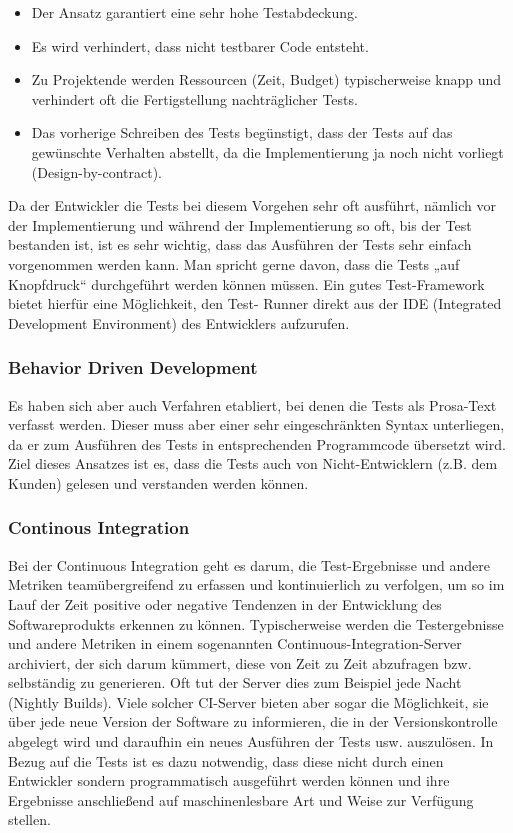 \begin{itemize}
  \item Der Ansatz garantiert eine sehr hohe Testabdeckung.
  \item Es wird verhindert, dass nicht testbarer Code entsteht.
  \item Zu Projektende werden Ressourcen (Zeit, Budget) typischerweise knapp und verhindert oft die Fertigstellung nachträglicher Tests.
  \item Das vorherige Schreiben des Tests begünstigt, dass der Tests auf das gewünschte Verhalten abstellt, da die Implementierung ja noch nicht vorliegt (Design-by-contract).
\end{itemize}

Da der Entwickler die Tests bei diesem Vorgehen sehr oft ausführt, nämlich vor der Implementierung und während der Implementierung so oft, bis der Test bestanden ist, ist es sehr wichtig, dass das Ausführen der Tests sehr einfach vorgenommen werden kann. Man spricht gerne davon, dass die Tests „auf Knopfdruck“ durchgeführt werden können müssen. Ein gutes Test-Framework bietet hierfür eine Möglichkeit, den Test- Runner direkt aus der IDE (Integrated Development Environment) des Entwicklers aufzurufen.

\subsubsection{Behavior Driven Development}
Es haben sich aber auch Verfahren etabliert, bei denen die Tests als Prosa-Text verfasst werden. Dieser muss aber einer sehr eingeschränkten Syntax unterliegen, da er zum Ausführen des Tests in entsprechenden Programmcode übersetzt wird. Ziel dieses Ansatzes ist es, dass die Tests auch von Nicht-Entwicklern (z.B. dem Kunden) gelesen und verstanden werden können.

\subsubsection{Continous Integration}
Bei der Continuous Integration geht es darum, die Test-Ergebnisse und andere Metriken teamübergreifend zu erfassen und kontinuierlich zu verfolgen, um so im Lauf der Zeit positive oder negative Tendenzen in der Entwicklung des Softwareprodukts erkennen zu können. Typischerweise werden die Testergebnisse und andere Metriken in einem sogenannten Continuous-Integration-Server archiviert, der sich darum kümmert, diese von Zeit zu Zeit abzufragen bzw. selbständig zu generieren. Oft tut der Server dies zum Beispiel jede Nacht (Nightly Builds). Viele solcher CI-Server bieten aber sogar die Möglichkeit, sie über jede neue Version der Software zu informieren, die in der Versionskontrolle abgelegt wird und daraufhin ein neues Ausführen der Tests usw. auszulösen. In Bezug auf die Tests ist es dazu notwendig, dass diese nicht durch einen Entwickler sondern programmatisch ausgeführt werden können und ihre Ergebnisse anschließend auf maschinenlesbare Art und Weise zur Verfügung stellen.